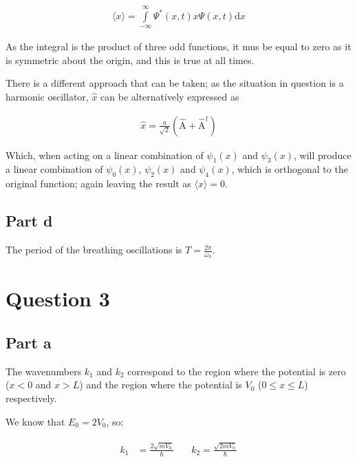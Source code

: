 \documentclass[paper=a4, fontsize=11pt]{scrartcl} %
\numberwithin{equation}{section} %
\numberwithin{figure}{section} %
\numberwithin{table}{section} %
\begin{document}
\begin{align}
\langle x \rangle =
\int\limits_{-\infty}^{\infty}\Psi^*\left(x,t\right)x \Psi\left(x,t\right) \mathrm{d}x
\end{align}

As the integral is the product of three odd functions, it mus be equal to zero as it is symmetric about the origin, and this is true at all times.

There is a different approach that can be taken; as the situation in question is a harmonic oscillator, $\hat{x}$ can be alternatively expressed as

\begin{align}
\hat{x} = \frac{a}{\sqrt{2}} \left( \hat{\mathrm{A}}+\hat{\mathrm{A}}^{\dagger}\right)
\end{align}

Which, when acting on a linear combination of $\psi_1(x)$ and $\psi_3(x)$, will produce a linear combination of $\psi_0(x)$, $\psi_2(x)$ and $\psi_4(x)$, which is orthogonal to the original function; again leaving the result as $\langle x \rangle = 0$.

\subsection{Part d}
The period of the breathing oscillations is $T = \frac{2\pi}{\omega_0}$.

\section{Question 3}
\subsection{Part a}
The wavenumbers $k_1$ and $k_2$ correspond to the region where the potential is zero ($x<0$ and $x>L$) and the region where the potential is $V_0$ ($0\leq x \leq L$) respectively.

We know that $E_0 = 2V_0$, so:

\begin{align}
\begin{split}
k_1 &=\frac{2\sqrt{mV_0}}{\hbar} \\
\end{split}
\quad
\begin{split}
k_2 = \frac{\sqrt{2mV_0}}{\hbar} \\
\end{split}
\end{align}
\end{document}
